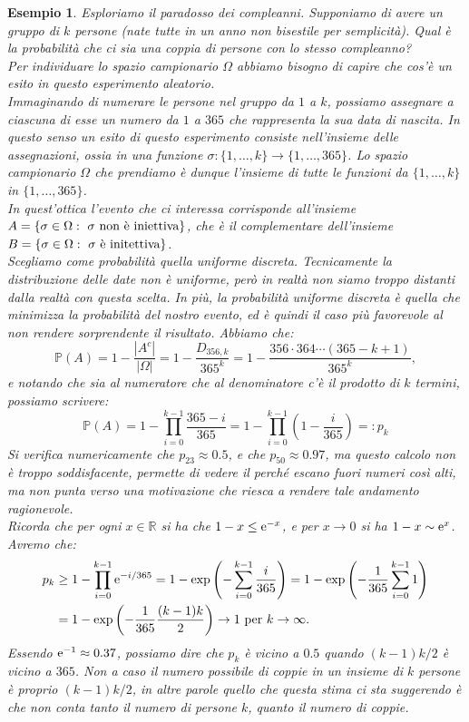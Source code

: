 \documentclass[11pt]{book}
\theoremstyle{Definizione}
\theoremstyle{TeoremaProposizioneLemmaCorollario}
\theoremstyle{OsservazioneNota}
\newtheorem{myes}{Esempio}[section]
\newcommand{\R}{\mathbb{R}}
\renewcommand{\P}{\mathbb{P}}
\newcommand{\e}{\textup{e}}
\begin{document}
\begin{myes}
Esploriamo il paradosso dei compleanni. Supponiamo di avere un gruppo di $k$ persone (nate tutte in un anno non bisestile per semplicità). Qual è la probabilità che ci sia una coppia di persone con lo stesso compleanno?\\
Per individuare lo spazio campionario $\Omega$ abbiamo bisogno di capire che cos'è un esito in questo esperimento aleatorio.\\
Immaginando di numerare le persone nel gruppo da $1$ a $k$, possiamo assegnare a ciascuna di esse un numero da $1$ a $365$ che rappresenta la sua data di nascita. In questo senso un esito di questo esperimento consiste nell'insieme delle assegnazioni, ossia in una funzione $\sigma: \{1,\dots,k\}\longrightarrow \{1,\dots,365\}$. Lo spazio campionario $\Omega$ che prendiamo è dunque l'insieme di tutte le funzioni da $\{1,\dots,k\}$ in $\{1,\dots,365\}$.\\
In quest'ottica l'evento che ci interessa corrisponde all'insieme $A = \{\sigma\in \Omega:\ \sigma \textup{ non è iniettiva}\}$, che è il complementare dell'insieme $B = \{\sigma\in \Omega:\ \sigma \textup{ è initettiva}\}$.\\
Scegliamo come probabilità quella uniforme discreta. Tecnicamente la distribuzione delle date non è uniforme, però in realtà non siamo troppo distanti dalla realtà con questa scelta. In più, la probabilità uniforme discreta è quella che minimizza la probabilità del nostro evento, ed è quindi il caso più favorevole al non rendere sorprendente il risultato.
Abbiamo che:
$$
\P(A) = 1- \frac{|A^c|}{|\Omega|} = 1 - \frac{D_{356,k}}{365^k} = 1-\frac{356\cdot 364 \cdots (365-k+1)}{365^k},
$$
e notando che sia al numeratore che al denominatore c'è il prodotto di $k$ termini, possiamo scrivere:
$$
\P(A) = 1-\prod_{i = 0}^{k-1}\frac{365-i}{365} = 1-\prod_{i = 0}^{k-1} \left(1-\frac{i}{365}\right) =: p_k
$$
Si verifica numericamente che $p_{23} \approx 0.5$, e che $p_{50} \approx 0.97$, ma questo calcolo non è troppo soddisfacente, permette di vedere il perché escano fuori numeri così alti, ma non punta verso una motivazione che riesca a rendere tale andamento ragionevole.\\
Ricorda che per ogni $x\in \R$ si ha che $1-x \leq \e^{-x}$, e per $x \to 0$ si ha $1-x \sim \e^x$. Avremo che:
\begin{align*}
p_k &\geq 1-\prod_{i = 0}^{k-1}\e^{-i/365} = 1-\exp\left(-\sum_{i = 0}^{k-1} \frac{i}{365}\right) = 1-\exp\left(-\frac{1}{365}\sum_{i = 0}^{k-1} 1\right)\\
&= 1-\exp\left(-\frac{1}{365}\frac{(k-1)k}{2}\right) \to 1 \textup{ per }k \to \infty.
\end{align*}
Essendo $\e^{-1} \approx 0.37$, possiamo dire che $p_k$ è vicino a $0.5$ quando $(k-1)k/2$ è vicino a $365$. Non a caso il numero possibile di coppie in un insieme di $k$ persone è proprio $(k-1)k/2$, in altre parole quello che questa stima ci sta suggerendo è che non conta tanto il numero di persone $k$, quanto il numero di coppie.
\end{myes}
\end{document}
